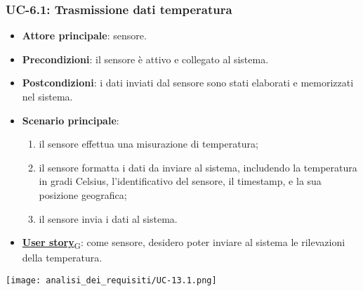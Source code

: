 \subsubsection{UC-6.1: Trasmissione dati temperatura}
\begin{itemize}
	\item \textbf{Attore principale}: sensore.
	\item \textbf{Precondizioni}: il sensore è attivo e collegato al sistema.
	\item \textbf{Postcondizioni}: i dati inviati dal sensore sono stati elaborati e memorizzati nel sistema.
	\item \textbf{Scenario principale}:
	      \begin{enumerate}
		      \item il sensore effettua una misurazione di temperatura;
		      \item il sensore formatta i dati da inviare al sistema, includendo la temperatura in gradi Celsius, l'identificativo del sensore,
		            il timestamp, e la sua posizione geografica;
		      \item il sensore invia i dati al sistema.
	      \end{enumerate}
	\item \href{https://7last.github.io/docs/rtb/documentazione-interna/glossario\#user-story}{\textbf{User story}\textsubscript{G}}: come sensore, desidero poter inviare al sistema le rilevazioni della temperatura.
\end{itemize}

\begin{center}
	\texttt{[image: analisi\_dei\_requisiti/UC-13.1.png]}
\end{center}

